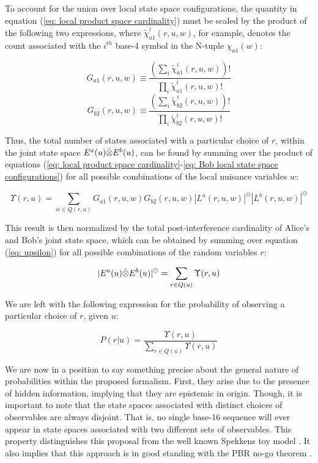 \documentclass{article}
\begin{document}
To account for the union over local state space configurations, the quantity in equation (\ref{eq: local product space cardinality}) must be scaled by the product of the following two expressions, where $\widetilde{\chi}_{a1}^i(r,u,w)$, for example, denotes the count associated with the $i^{th}$ base-4 symbol in the N-tuple $\chi_{a1}(w)$:

\begin{equation}
    G_{a1}(r,u,w) \equiv \frac{(\sum_{i}\widetilde{\chi}_{a1}^i(r,u,w))!}{\prod_{i}\widetilde{\chi}_{a1}^i(r,u,w)!}
    \label{eq: Alice local state space configurations}
\end{equation}
\begin{equation}
    G_{b2}(r,u,w) \equiv \frac{(\sum_{i}\widetilde{\chi}_{b2}^i(r,u,w))!}{\prod_{i}\widetilde{\chi}_{b2}^i(r,u,w)!}
    \label{eq: Bob local state space configurations}
\end{equation}

Thus, the total number of states associated with a particular choice of $r$, within the joint state space $E^{a}(u)\Bar{\otimes}E^{b}(u)$, can be found by summing over the product of equations (\ref{eq: local product space cardinality}-\ref{eq: Bob local state space configurations}) for all possible combinations of the local nuisance variables $w$:

\begin{equation}
    \Upsilon(r,u)=\sum_{w\in Q(r,u)}G_{a1}(r,u,w)G_{b2}(r,u,w)|L^a(r,u,w)|^\circleddash|L^b(r,u,w)|^\circleddash
    \label{eq: upsilon}
\end{equation}

This result is then normalized by the total post-interference cardinality of Alice's and Bob's joint state space, which can be obtained by summing over equation (\ref{eq: upsilon}) for all possible combinations of the random variables $r$:

\begin{equation}
    |E^{a}(u)\Bar{\otimes}E^{b}(u)|^\circleddash=\sum_{r\in Q(u)}\Upsilon(r,u)
\end{equation}

We are left with the following expression for the probability of observing a particular choice of $r$, given $u$:

\begin{equation}
    P(r|u)=\frac{\Upsilon(r,u)}{\sum_{r\in Q(u)}\Upsilon(r,u)}
    \label{eq: probability}
\end{equation}

We are now in a position to say something precise about the general nature of probabilities within the proposed formalism. First, they arise due to the presence of hidden information, implying that they are epistemic in origin. Though, it is important to note that the state spaces associated with distinct choices of observables are always disjoint. That is, no single base-16 sequence will ever appear in state spaces associated with two different sets of observables. This property distinguishes this proposal from the well known Spekkens toy model \cite{Spekkens2007}. It also implies that this approach is in good standing with the PBR no-go theorem \cite{Pusey2012}. 
\end{document}
